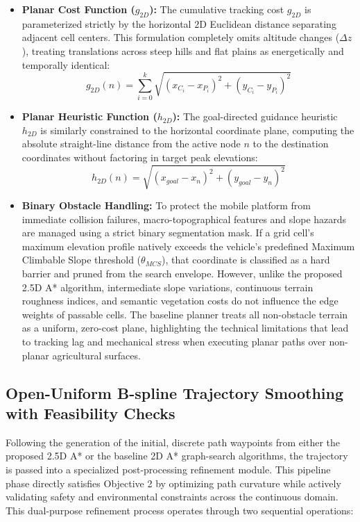 \begin{itemize}
    \item \textbf{Planar Cost Function ($g_{2D}$):} The cumulative tracking cost $g_{2D}$ is parameterized strictly by the horizontal 2D Euclidean distance separating adjacent cell centers. This formulation completely omits altitude changes ($\Delta z$), treating translations across steep hills and flat plains as energetically and temporally identical:
    \begin{equation}
        g_{2D}(n) = \sum_{i=0}^{k} \sqrt{(x_{C_i} - x_{P_i})^2 + (y_{C_i} - y_{P_i})^2}
    \end{equation}

    \item \textbf{Planar Heuristic Function ($h_{2D}$):} The goal-directed guidance heuristic $h_{2D}$ is similarly constrained to the horizontal coordinate plane, computing the absolute straight-line distance from the active node $n$ to the destination coordinates without factoring in target peak elevations:
    \begin{equation}
        h_{2D}(n) = \sqrt{(x_{goal} - x_n)^2 + (y_{goal} - y_n)^2}
    \end{equation}

    \item \textbf{Binary Obstacle Handling:} To protect the mobile platform from immediate collision failures, macro-topographical features and slope hazards are managed using a strict binary segmentation mask. If a grid cell's maximum elevation profile natively exceeds the vehicle's predefined Maximum Climbable Slope threshold ($\theta_{MCS}$), that coordinate is classified as a hard barrier and pruned from the search envelope. However, unlike the proposed 2.5D A* algorithm, intermediate slope variations, continuous terrain roughness indices, and semantic vegetation costs do not influence the edge weights of passable cells. The baseline planner treats all non-obstacle terrain as a uniform, zero-cost plane, highlighting the technical limitations that lead to tracking lag and mechanical stress when executing planar paths over non-planar agricultural surfaces.
\end{itemize}

\subsection{Open-Uniform B-spline Trajectory Smoothing with Feasibility Checks}

Following the generation of the initial, discrete path waypoints from either the proposed 2.5D A* or
the baseline 2D A* graph-search algorithms, the trajectory is passed into a specialized
post-processing refinement module. This pipeline phase directly satisfies Objective 2 by optimizing
path curvature while actively validating safety and environmental constraints across the continuous
domain. This dual-purpose refinement process operates through two sequential operations:

